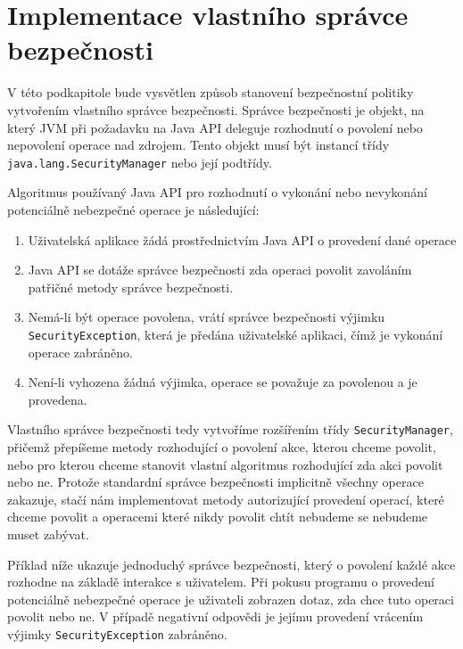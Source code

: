 \section{Implementace vlastního správce bezpečnosti} \label{vlastniSM}

V této podkapitole bude vysvětlen způsob stanovení bezpečnostní politiky vytvořením vlastního správce bezpečnosti.
Správce bezpečnosti je objekt, na který JVM při požadavku na Java API deleguje rozhodnutí o povolení nebo nepovolení operace nad zdrojem.
Tento objekt musí být instancí třídy {\tt java.lang.SecurityManager} nebo její podtřídy. \cite{tutorialsTSM}

Algoritmus používaný Java API pro rozhodnutí o vykonání nebo nevykonání potenciálně nebezpečné operace je následující: \cite[4.1.1]{oaks}

\begin{enumerate}
  \item Uživatelská aplikace žádá prostřednictvím Java API o provedení dané operace
  \item Java API se dotáže správce bezpečnosti zda operaci povolit zavoláním patřičné metody správce bezpečnosti.
  \item Nemá-li být operace povolena, vrátí správce bezpečnosti výjimku {\tt SecurityException}, která je předána uživatelské aplikaci, čímž je vykonání operace zabráněno.
  \item Není-li vyhozena žádná výjimka, operace se považuje za povolenou a je provedena.
\end{enumerate}

Vlastního správce bezpečnosti tedy vytvoříme rozšířením třídy {\tt SecurityManager}, přičemž přepíšeme metody rozhodující o povolení akce, kterou chceme povolit, nebo pro kterou chceme stanovit vlastní algoritmus rozhodující zda akci povolit nebo ne.
Protože standardní správce bezpečnosti implicitně všechny operace zakazuje, stačí nám implementovat metody autorizující provedení operací, které chceme povolit a operacemi které nikdy povolit chtít nebudeme se nebudeme muset zabývat.

Příklad níže ukazuje jednoduchý správce bezpečnosti, který o povolení každé akce rozhodne na základě interakce s uživatelem. Při pokusu programu o provedení potenciálně nebezpečné operace je uživateli zobrazen dotaz, zda chce tuto operaci povolit nebo ne. V případě negativní odpovědi je jejímu provedení vrácením výjimky {\tt SecurityException} zabráněno.


